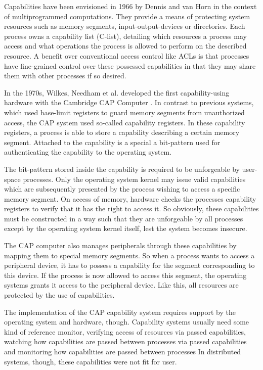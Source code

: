 \cite{dennis1966programming}

Capabilities have been envisioned in 1966 by Dennis and van Horn \cite{dennis1966programming} in the context of multiprogrammed computations.
They provide a means of protecting system resources such as memory segments, input-output-devices or directories.
Each process owns a capability list (C-list), detailing which resources a process may access and what operations the process is allowed to perform on the described resource.
A benefit over conventional access control like ACLs is that processes have fine-grained control over these possessed capabilities in that they may share them with other processes if so desired.

In the 1970s, Wilkes, Needham et al. developed the first capability-using hardware with the Cambridge CAP Computer \cite{wilkes1979cambridge}.
In contrast to previous systems, which used base-limit registers to guard memory segments from unauthorized access, the CAP system used so-called capability registers.
In these capability registers, a process is able to store a capability describing a certain memory segment.
Attached to the capability is a special a bit-pattern used for authenticating the capability to the operating system.

The bit-pattern stored inside the capability is required to be unforgeable by user-space processes.
Only the operating system kernel may issue valid capabilities which are subsequently presented by the process wishing to access a specific memory segment.
On access of memory, hardware checks the processes capability registers to verify that it has the right to access it.
So obviously, these capabilities must be constructed in a way such that they are unforgeable by all processes except by the operating system kernel itself, lest the system becomes insecure.

The CAP computer also manages peripherals through these capabilities by mapping them to special memory segments.
So when a process wants to access a peripheral device, it has to possess a capability for the segment corresponding to this device.
If the process is now allowed to access this segment, the operating systems grants it access to the peripheral device.
Like this, all resources are protected by the use of capabilities.

The implementation of the CAP capability system requires support by the operating system and hardware, though.
Capability systems usually need some kind of reference monitor, verifying access of resources via passed capabilities, watching how capabilities are passed between processes via passed capabilities and monitoring how capabilities are passed between processes
In distributed systems, though, these capabilities were not fit for user.

